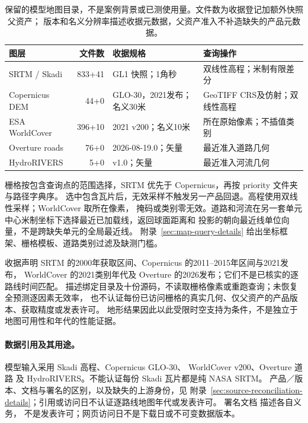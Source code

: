 \documentclass[UTF8,11pt]{ctexart}
\begin{document}
\begin{table}[htbp]
\centering\footnotesize
\caption{保留的模型地图目录，不是案例背景或已测使用量。文件数为收据登记加额外快照父资产；
版本和名义分辨率描述收据元数据，父资产准入不补造缺失的产品元数据。}
\label{tab:model-map-catalog}
\begin{tabular}{@{}p{.24\linewidth}rp{.23\linewidth}p{.32\linewidth}@{}}
\toprule
图层 & 文件数 & 收据规格 & 查询操作\\
\midrule
SRTM / Skadi & 833+41 & GL1 快照；1角秒 & 双线性高程；米制有限差分\\
Copernicus DEM & 44+0 & GLO-30，2021发布；名义30米 & GeoTIFF CRS及仿射；双线性高程\\
ESA WorldCover & 396+10 & 2021 v200；名义10米 & 所在原始像素；不插值类别\\
Overture roads & 76+0 & 2026-08-19.0；矢量 & 最近准入道路几何\\
HydroRIVERS & 5+0 & v1.0；矢量 & 最近准入河流几何\\
\bottomrule
\end{tabular}
\end{table}

栅格按包含查询点的范围选择，SRTM 优先于 Copernicus，再按 priority 文件夹与路径字典序。
选中包含瓦片后，无效采样不触发另一产品回退。高程使用双线性采样；WorldCover 取所在像素，
掩码或类别零无效。道路和河流在另一套单元中心米制坐标下选择最近已加载线，返回球面距离和
投影的朝向最近线单位向量，不是跨缺失单元的全局最近线。
附录~\ref{sec:map-query-details} 给出坐标框架、栅格模板、道路类别过滤及缺测门槛。

收据声明 SRTM 的2000年获取区间、Copernicus 的2011--2015年区间与2021发布，
WorldCover 的2021类别年代及 Overture 的2026发布；它们不是已核实的逐路线时间匹配。
描述绑定目录及十份源码，不读取栅格像素或重跑查询；未恢复全预测逐因素无效率，
也不认证每份已访问栅格的真实几何、仅父资产的产品版本、获取精度或发表许可。
地形结果因此以此受限时空支持为条件，不是独立于地图可用性和年代的性能证据。

\paragraph{数据引用及其用途。}
\label{sec:data-reference-roles}
模型输入采用 Skadi 高程\cite{mapzenterrain}、Copernicus GLO-30\cite{copernicusdem2021}、
WorldCover v200\cite{worldcover2021}、Overture 道路\cite{overture202608}
及 HydroRIVERS\cite{hydrorivers2013}。不能认证每份 Skadi 瓦片都是纯 NASA SRTM。
产品／版本、文档与署名的区别，以及缺失的上游身份，见
附录~\ref{sec:source-reconciliation-details}；引用或访问日不认证逐路线地图年代或发表许可。
署名文档\cite{mapzenattribution,overtureattribution,hydroriverslicense} 描述各自义务，
不是发表许可；网页访问日不是下载日或不可变数据版本。
\end{document}
